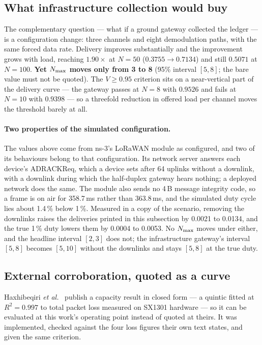 \subsection{What infrastructure collection would buy}

The complementary question --- what if a ground gateway collected the ledger --- is a
configuration change: three channels and eight demodulation paths, with the same forced data
rate. Delivery improves substantially and the improvement grows with load, reaching
$1.90\times$ at $N{=}50$ ($0.3755 \rightarrow 0.7134$) and still $0.5071$ at $N{=}100$.
\textbf{Yet $N_{\max}$ moves only from 3 to 8} (95\% interval $[5,8]$; the bare value must not be
quoted). The $V \geq 0.95$ criterion sits on a near-vertical part of the delivery curve --- the
gateway passes at $N{=}8$ with $0.9526$ and fails at $N{=}10$ with $0.9398$ --- so a threefold
reduction in offered load per channel moves the threshold barely at all.

\paragraph{Two properties of the simulated configuration.} The values above come from ns-3's
LoRaWAN module as configured, and two of its behaviours belong to that configuration. Its network
server answers each device's ADRACKReq, which a device sets after 64 uplinks without a downlink,
with a downlink during which the half-duplex gateway hears nothing; a deployed network does the
same. The module also sends no 4\,B message integrity code, so a frame is on air for 358.7\,ms
rather than 363.8\,ms, and the simulated duty cycle lies about 1.4\,\% below 1\,\%. Measured in a
copy of the scenario, removing the downlinks raises the deliveries printed in this subsection by
0.0021 to 0.0134, and the true 1\,\% duty lowers them by 0.0004 to 0.0053. No $N_{\max}$ moves
under either, and the
headline interval $[2,3]$ does not; the infrastructure gateway's interval $[5,8]$ becomes
$[5,10]$ without the downlinks and stays $[5,8]$ at the true duty.

\subsection{External corroboration, quoted as a curve}

Haxhibeqiri \emph{et al.}~\cite{haxhibeqiri2017lora} publish a capacity result in closed form
--- a quintic fitted at $R^2 = 0.997$ to total packet loss measured on SX1301 hardware --- so it
can be evaluated at this work's operating point instead of quoted at theirs. It was implemented,
checked against the four loss figures their own text states, and given the same criterion.

